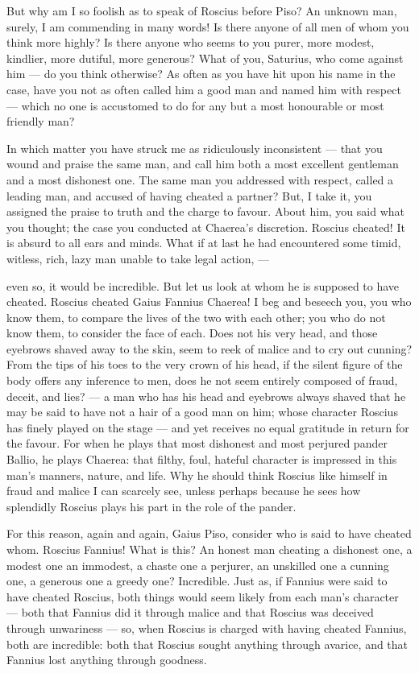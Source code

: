  But why am I so foolish as to speak of Roscius before Piso? An unknown man, surely, I am commending in many words! Is there anyone of all men of whom you think more highly? Is there anyone who seems to you purer, more modest, kindlier, more dutiful, more generous? What of you, Saturius, who come against him --- do you think otherwise? As often as you have hit upon his name in the case, have you not as often called him a good man and named him with respect --- which no one is accustomed to do for any but a most honourable or most friendly man?

 In which matter you have struck me as ridiculously inconsistent --- that you wound and praise the same man, and call him both a most excellent gentleman and a most dishonest one. The same man you addressed with respect, called a leading man, and accused of having cheated a partner? But, I take it, you assigned the praise to truth and the charge to favour. About him, you said what you thought; the case you conducted at Chaerea's discretion. Roscius cheated! It is absurd to all ears and minds. What if at last he had encountered some timid, witless, rich, lazy man unable to take legal action, ---

 even so, it would be incredible. But let us look at whom he is supposed to have cheated. Roscius cheated Gaius Fannius Chaerea! I beg and beseech you, you who know them, to compare the lives of the two with each other; you who do not know them, to consider the face of each. Does not his very head, and those eyebrows shaved away to the skin, seem to reek of malice and to cry out cunning? From the tips of his toes to the very crown of his head, if the silent figure of the body offers any inference to men, does he not seem entirely composed of fraud, deceit, and lies? --- a man who has his head and eyebrows always shaved that he may be said to have not a hair of a good man on him; whose character Roscius has finely played on the stage --- and yet receives no equal gratitude in return for the favour. For when he plays that most dishonest and most perjured pander Ballio, he plays Chaerea: that filthy, foul, hateful character is impressed in this man's manners, nature, and life. Why he should think Roscius like himself in fraud and malice I can scarcely see, unless perhaps because he sees how splendidly Roscius plays his part in the role of the pander.

 For this reason, again and again, Gaius Piso, consider who is said to have cheated whom. Roscius Fannius! What is this? An honest man cheating a dishonest one, a modest one an immodest, a chaste one a perjurer, an unskilled one a cunning one, a generous one a greedy one? Incredible. Just as, if Fannius were said to have cheated Roscius, both things would seem likely from each man's character --- both that Fannius did it through malice and that Roscius was deceived through unwariness --- so, when Roscius is charged with having cheated Fannius, both are incredible: both that Roscius sought anything through avarice, and that Fannius lost anything through goodness.

